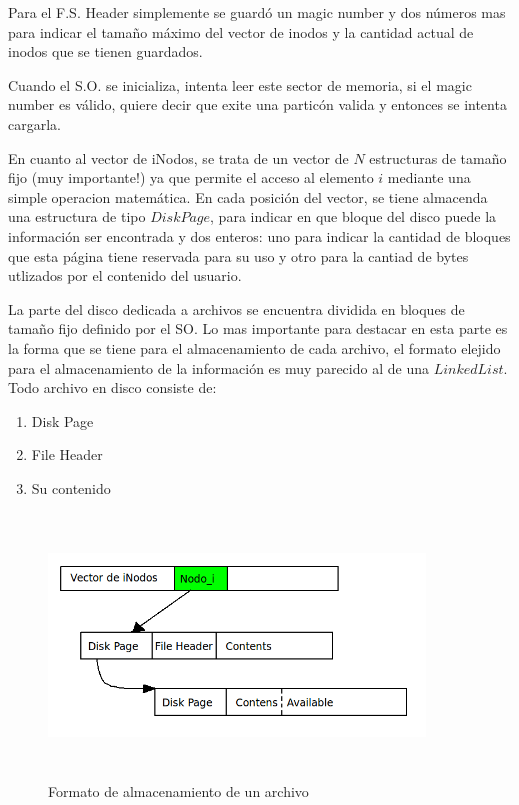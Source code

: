 \documentclass[english]{article}
\begin{document}
Para el F.S. Header simplemente se guardó un magic number y dos números
mas para indicar el tamaño máximo del vector de inodos y la cantidad
actual de inodos que se tienen guardados.

Cuando el S.O. se inicializa, intenta leer este sector de memoria, si
el magic number es válido, quiere decir que exite una particón valida
y entonces se intenta cargarla.

En cuanto al vector de iNodos, se trata de un vector de $N$ estructuras
de tamaño fijo (muy importante!) ya que permite el acceso al elemento
$i$ mediante una simple operacion matemática. En cada posición del vector, 
se tiene almacenda una estructura de tipo $DiskPage$, para indicar en que 
bloque del disco puede la información ser encontrada y dos enteros: uno para 
indicar la cantidad de bloques que esta página tiene reservada para su uso y 
otro para la cantiad de bytes utlizados por el contenido del usuario.

La parte del disco dedicada a archivos se encuentra dividida en bloques
de tamaño fijo definido por el SO. Lo mas importante para destacar
en esta parte es la forma que se tiene para el almacenamiento de cada
archivo, el formato elejido para el almacenamiento de la información
es muy parecido al de una $LinkedList$. Todo archivo en disco consiste
de:
\begin{enumerate}
\item Disk Page
\item File Header
\item Su contenido
\end{enumerate}

\begin{figure}[H]
\begin{center}
\includegraphics[width=10cm,height=7cm,keepaspectratio]{Archivo}

\caption{Formato de almacenamiento de un archivo}
\end{center}
\end{figure}
\end{document}
